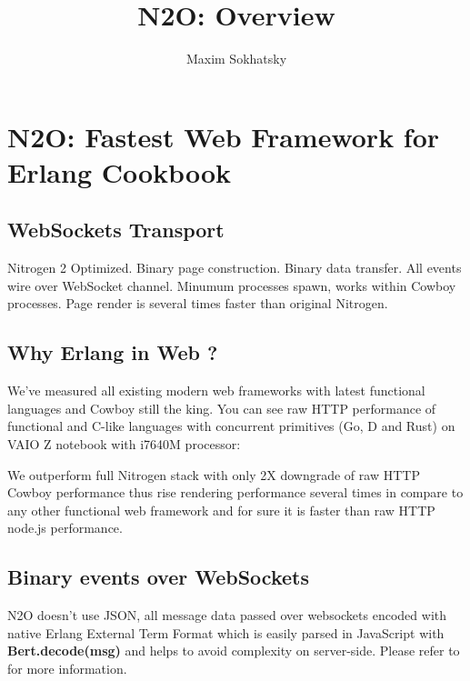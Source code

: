 \documentclass[11pt]{article}
\begin{document}
\title{N2O: Overview}
\author{Maxim Sokhatsky}

\paragraph{}
\section*{N2O: Fastest Web Framework for Erlang Cookbook}

\subsection*{WebSockets Transport}
Nitrogen 2 Optimized. Binary page construction.
Binary data transfer. All events wire over WebSocket channel.
Minumum processes spawn, works within Cowboy processes. 
Page render is several times faster than original Nitrogen.

\subsection*{Why Erlang in Web ?}
We've measured all existing modern web frameworks with latest functional languages and Cowboy still the king.
You can see raw HTTP performance of functional and C-like languages with concurrent primitives (Go, D and Rust)
on VAIO Z notebook with i7640M processor:


We outperform full Nitrogen stack with only 2X downgrade of raw HTTP Cowboy
performance thus rise rendering performance several times in compare to
any other functional web framework and for sure it is faster than raw HTTP node.js performance.

\subsection*{Binary events over WebSockets}
N2O doesn't use JSON, all message data passed over websockets encoded with
native Erlang External Term Format which is easily parsed in JavaScript
with {\bf Bert.decode(msg)} and helps to avoid complexity on server-side.
Please refer to  for more information.
\end{document}
